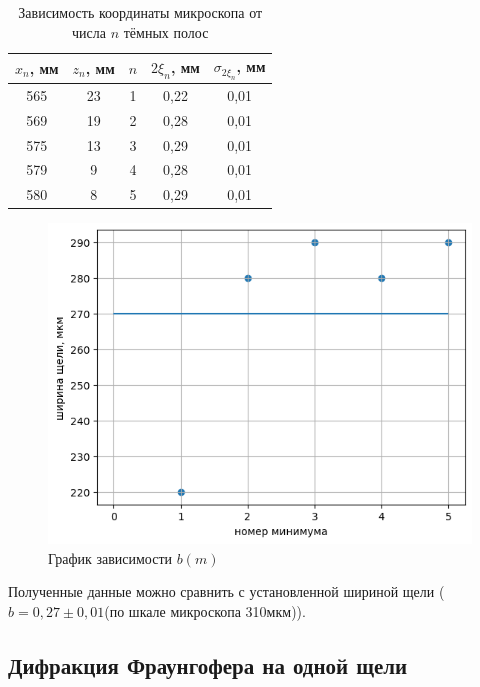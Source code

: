 \documentclass[a4paper,12pt]{article} %
\begin{document}

\begin{table}[H]
	\caption{Зависимость координаты микроскопа от числа $ n $ тёмных полос}
	\label{table1}	
	\begin{center}
		\begin{tabular}{|c|c|c|c|c|}
			\hline
			$ x_n $, мм  & $ z_n $, мм & $ n $& $ 2\xi_n $, мм& $ \sigma_{2\xi_n} $, мм\\
			\hline
			565	&	23	&	1   & 0,22  & 0,01
			\\ \hline
			569	&	19	&	2   & 0,28  & 0,01
			\\ \hline
			575	& 	13	&	3   & 0,29  & 0,01
			\\ \hline
			579	&	9	&	4   & 0,28  & 0,01	\\
			\hline
            580	&	8	&	5   & 0,29  & 0,01	\\
			\hline
		\end{tabular}
	\end{center}

\end{table}

\begin{figure}[H]
    \centering
    \includegraphics[scale=0.65]{image.png}
    \caption{График зависимости $b(m)$}
    \label{fig:my_label}
\end{figure}

Полученные данные можно сравнить с установленной шириной щели ($ b = 0,27 \pm 0,01$(по шкале микроскопа 310мкм)).

\subsection{Дифракция Фраунгофера на одной щели}
\end{document}
